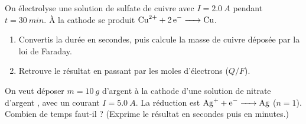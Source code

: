 \documentclass[11pt,a4paper]{article}
\newcounter{exo}
\begin{document}
\begin{exo}
On électrolyse une solution de sulfate de cuivre  avec $I=\SI{2.0}{A}$ pendant
$t=\SI{30}{min}$. À la cathode se produit $\ce{Cu^{2+} + 2 e^- -> Cu}$.
\begin{enumerate}[label=(\alph*),leftmargin=2em,topsep=1pt,itemsep=1pt]
  \item Convertis la durée en secondes, puis calcule la masse de cuivre déposée par la loi de Faraday.
  \item Retrouve le résultat en passant par les moles d'électrons ($Q/F$).
\end{enumerate}
\end{exo}

\begin{exo}
On veut déposer $m=\SI{10}{g}$ d'argent à la cathode d'une solution de nitrate d'argent ,
avec un courant $I=\SI{5.0}{A}$. La réduction est $\ce{Ag+ + e^- -> Ag}$ ($n=1$).
Combien de temps faut-il ? (Exprime le résultat en secondes puis en minutes.)
\end{exo}
\end{document}
